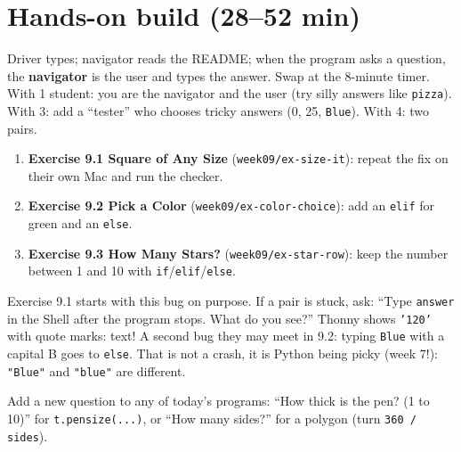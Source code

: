 \section{Hands-on build (28--52 min)}
\begin{pairroles}
Driver types; navigator reads the README; when the program asks a question, the \textbf{navigator} is the user and types the answer. Swap at the 8-minute timer.
With 1 student: you are the navigator and the user (try silly answers like \texttt{pizza}). With 3: add a \enquote{tester} who chooses tricky answers (0, 25, \texttt{Blue}). With 4: two pairs.
\end{pairroles}
\begin{enumerate}[leftmargin=1.4em,itemsep=2pt]
  \item \textbf{Exercise 9.1 Square of Any Size} (\texttt{week09/ex-size-it}): repeat the fix on their own Mac and run the checker.
  \item \textbf{Exercise 9.2 Pick a Color} (\texttt{week09/ex-color-choice}): add an \texttt{elif} for green and an \texttt{else}.
  \item \textbf{Exercise 9.3 How Many Stars?} (\texttt{week09/ex-star-row}): keep the number between 1 and 10 with \texttt{if}/\texttt{elif}/\texttt{else}.
\end{enumerate}
\begin{bughunt}
Exercise 9.1 starts with this bug on purpose. If a pair is stuck, ask: \enquote{Type \texttt{answer} in the Shell after the program stops. What do you see?} Thonny shows \texttt{'120'} with quote marks: text! A second bug they may meet in 9.2: typing \texttt{Blue} with a capital B goes to \texttt{else}. That is not a crash, it is Python being picky (week 7!): \texttt{"Blue"} and \texttt{"blue"} are different.
\end{bughunt}
\begin{freebuild}
Add a new question to any of today's programs: \enquote{How thick is the pen? (1 to 10)} for \texttt{t.pensize(...)}, or \enquote{How many sides?} for a polygon (turn \texttt{360 / sides}).
\end{freebuild}

